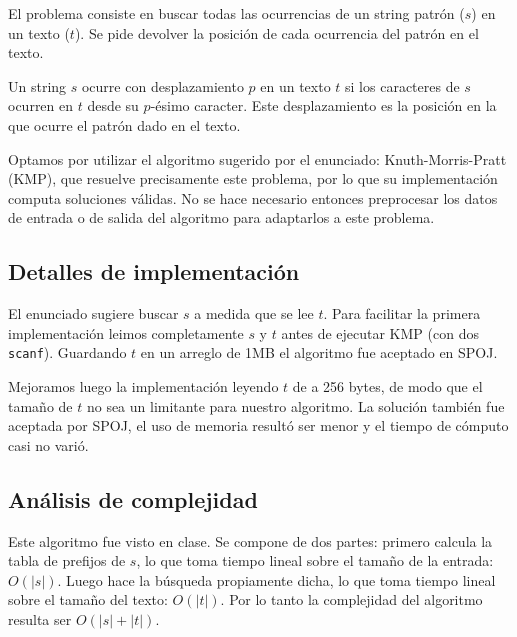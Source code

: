 El problema consiste en buscar todas las ocurrencias de un string patrón ($s$)
en un texto ($t$). Se pide devolver la posición de cada ocurrencia del patrón en
el texto.

Un string $s$ ocurre con desplazamiento $p$ en un texto $t$ si los caracteres
de $s$ ocurren en $t$ desde su $p$-ésimo caracter. Este desplazamiento es la
posición en la que ocurre el patrón dado en el texto.

Optamos por utilizar el algoritmo sugerido por el enunciado: Knuth-Morris-Pratt
(KMP), que resuelve precisamente este problema, por lo que su implementación
computa soluciones válidas. No se hace necesario entonces preprocesar los datos
de entrada o de salida del algoritmo para adaptarlos a este problema.

\subsection*{Detalles de implementación}

El enunciado sugiere buscar $s$ a medida que se lee $t$. Para facilitar la
primera implementación leimos completamente $s$ y $t$ antes de ejecutar KMP
(con dos {\tt scanf}). Guardando $t$ en un arreglo de 1MB el algoritmo fue
aceptado en SPOJ.

Mejoramos luego la implementación leyendo $t$ de a 256 bytes, de modo que
el tamaño de $t$ no sea un limitante para nuestro algoritmo. La solución
también fue aceptada por SPOJ, el uso de memoria resultó ser menor y el
tiempo de cómputo casi no varió.

\subsection*{Análisis de complejidad}

Este algoritmo fue visto en clase. Se compone de dos partes: primero calcula
la tabla de prefijos de $s$, lo que toma tiempo lineal sobre el tamaño de la
entrada: $O(|s|)$. Luego hace la búsqueda propiamente dicha, lo que toma
tiempo lineal sobre el tamaño del texto: $O(|t|)$. Por lo tanto la complejidad
del algoritmo resulta ser $O(|s| + |t|)$.
